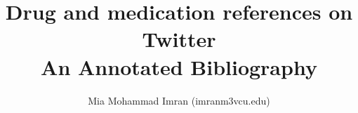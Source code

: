 \documentclass{amia}
\begin{document}
\title{Drug and medication references on Twitter\\\medskip An Annotated Bibliography}
\author{Mia Mohammad Imran (imranm3vcu.edu)}

\maketitle
\nocite{*}


\end{document}
